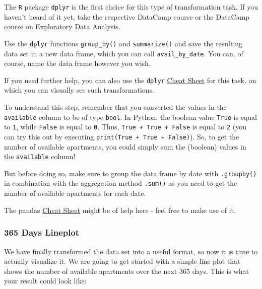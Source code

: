 \documentclass[
  11pt,
]{article}
\newenvironment{tips}[1]
  {
  \begin{itemize}
  \footnotesize
  \renewcommand{\labelitemi}{
    \raisebox{-.7\height}[0pt][0pt]{
      {\setkeys{Gin}{width=3em,keepaspectratio}
        \texttt{[image: images/\#1.png]}}
    }
  }
  \setlength{\fboxsep}{1em}
  \begin{rbox}
  \item
  }
  {
  \end{rbox}
  \end{itemize}
  }
\newenvironment{tipsp}[1]
  {
  \begin{itemize}
  \footnotesize
  \renewcommand{\labelitemi}{
    \raisebox{-.7\height}[0pt][0pt]{
      {\setkeys{Gin}{width=3em,keepaspectratio}
        \texttt{[image: images/\#1.png]}}
    }
  }
  \setlength{\fboxsep}{1em}
  \begin{pbox}
  \item
  }
  {
  \end{pbox}
  \end{itemize}
  }
\begin{document}
\begin{tips}r
The \texttt{R} package \texttt{dplyr} is the first choice for this type of transformation task.
If you haven't heard of it yet, take the respective DataCamp course or the DataCamp course on Exploratory Data Analysis.

Use the \texttt{dplyr} functions \texttt{group\_by()} and \texttt{summarize()} and save the resulting data set in a new data frame, which you can call \texttt{avail\_by\_date}.
You can, of course, name the data frame however you wish.

If you need further help, you can also use the \texttt{dplyr} \href{https://www.rstudio.com/wp-content/uploads/2015/02/data-wrangling-cheatsheet.pdf}{Cheat Sheet} for this task, on which you can visually see such transformations.

\end{tips}

\begin{tipsp}p
To understand this step, remember that you converted the values in the \texttt{available} column to be of type \texttt{bool}.
In Python, the boolean value \texttt{True} is equal to \texttt{1}, while \texttt{False} is equal to \texttt{0}.
Thus, \texttt{True\ +\ True\ +\ False} is equal to \texttt{2} (you can try this out by executing \texttt{print(True\ +\ True\ +\ False)}).
So, to get the number of available apartments, you could simply sum the (boolean) values in the \texttt{available} column!

But before doing so, make sure to group the data frame by date with \texttt{.groupby()} in combination with the aggregation method \texttt{.sum()} as you need to get the number of available apartments for each date.

The pandas \href{https://pandas.pydata.org/Pandas_Cheat_Sheet.pdf}{Cheat Sheet} might be of help here - feel free to make use of it.

\end{tipsp}

\hypertarget{days-lineplot}{%
\subsubsection{365 Days Lineplot}\label{days-lineplot}}

We have finally transformed the data set into a useful format, so now it is time to actually visualize it.
We are going to get started with a simple line plot that shows the number of available apartments over the next 365 days.
This is what your result could look like:
\end{document}
